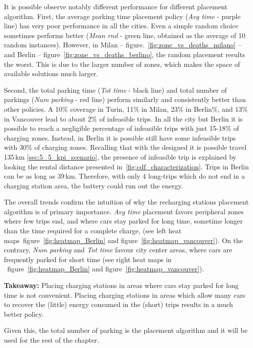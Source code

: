 It is possible observe notably different performance for different placement algorithm.
First, the average parking time placement policy (\textit{Avg time} - purple line) has very poor performance in all the cities.
Even a simple random choice sometimes performs better (\textit{Mean rnd} - green line, obtained as the average of 10 random instances). 
However, in Milan -- figure.~\ref{fig:zone_vs_deaths_milano} -- and Berlin -- figure~\ref{fig:zone_vs_deaths_berlino}, the random placement results the worst. This is due to the larger number of zones, which makes the space of available solutions much larger.

Second, the total parking time  (\textit{Tot time} - black line) and total number of parkings (\textit{Num parking} - red line) perform similarly and consistently better than other policies. A 10\% coverage in Turin, 11\% in Milan, 23\% in Berlin\%, and 13\% in Vancouver lead to about 2\% of infeasible trips. 
In all the city but Berlin it is possible to reach a negligible percentage of infeasible trips with just 15-18\% of charging zones. Instead, in Berlin it is possible still have some infeasible trips with 30\% of charging zones. Recalling that with the designed it is possible travel 135\,km \ref{sec:5_5_kpi_scenario}, the presence of infeasible trip is explained by looking the rental distance presented in~\ref{fig:cdf_characterization}. Trips in Berlin can be as long as 39\,km. Therefore, with only 4 long-trips which do not end in a charging station area, the battery could run out the energy.

The overall trends confirm the intuition of why the recharging stations placement algorithm is of primary importance. \textit{Avg time} placement favors peripheral zones where few trips end, and where cars stay parked for long time, sometime longer than the time required for a complete charge, (see left heat maps~figure~\ref{fig:heatmap_Berlin} and figure~\ref{fig:heatmap_vancouver}). On the contrary, \textit{Num parking} and \textit{Tot time} favour city center areas, where cars are frequently parked for short time (see right heat maps in ~figure~\ref{fig:heatmap_Berlin} and figure~\ref{fig:heatmap_vancouver}). 

\textbf{Takeaway:} Placing charging stations in areas where cars stay parked for long time is not convenient. Placing charging stations in areas which allow many cars to recover the (little) energy consumed in the (short) trips results in a much better policy.

Given this, the total number of parking is the placement algorithm and it will be used for the rest of the chapter. 

